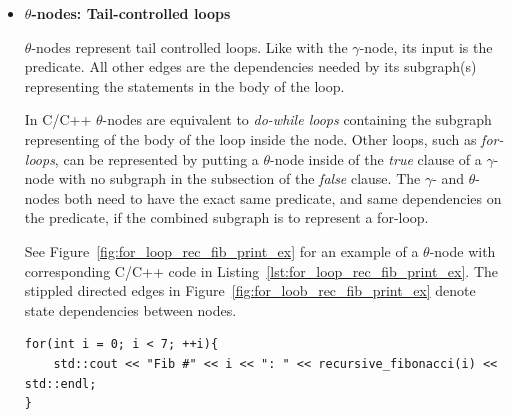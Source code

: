 \begin{itemize}
\item \textbf{$\theta$-nodes: Tail-controlled loops}

\textit{$\theta$}-nodes represent tail controlled loops. Like with the
$\gamma$-node, its input is the predicate. All other edges are the dependencies
needed by its subgraph(s) representing the statements in the body of the loop.

In C/C++ $\theta$-nodes are equivalent to \textit{do-while loops} containing the
subgraph representing of the body of the loop inside the node. Other loops, such
as \textit{for-loops}, can be represented by putting a $\theta$-node inside of
the \textit{true} clause of a $\gamma$-node with no subgraph in the subsection
of the \textit{false} clause. The $\gamma$- and $\theta$-nodes both need to have
the exact same predicate, and same dependencies on the predicate, if the
combined subgraph is to represent a for-loop.

See Figure~\ref{fig:for_loop_rec_fib_print_ex} for an example of a $\theta$-node
with corresponding C/C++ code in Listing~\ref{lst:for_loop_rec_fib_print_ex}.
The stippled directed edges in Figure~\ref{fig:for_loob_rec_fib_print_ex} denote
state dependencies between nodes.

\begin{lstlisting}[label={lst:for_loop_rec_fib_print_ex}, style=customcpp,
caption={C/C++ code corresponding to the RVSDG subgraph in
Figure~\ref{fig:for_loop_rec_fib_print_ex}.}]
for(int i = 0; i < 7; ++i){
	std::cout << "Fib #" << i << ": " << recursive_fibonacci(i) << std::endl;
}
\end{lstlisting}
\vspace{-4\parskip} %
\newpage


\end{itemize}
